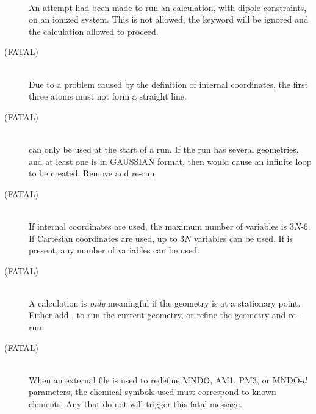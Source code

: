 \begin{description}
\item[]~\\
An attempt had been made to run an  calculation, with dipole 
constraints, on an ionized system.  This is not allowed, the keyword
 will be ignored and the calculation allowed to proceed.

\item[ (FATAL)]~\\
Due to a problem caused by the definition of internal coordinates,
the first three atoms must not form a straight line.

\item[ (FATAL)]~\\
 can only be used at the start of a run.  If the run has several
geometries, and at least one is in GAUSSIAN format, then  would
cause an infinite loop to be created.  Remove  and re-run.

\item[ (FATAL)]~\\
If internal coordinates are used, the maximum number of variables is 3$N$-6.  If 
Cartesian coordinates are used, up to 3$N$ variables can be used.  If 
is present, any number of variables can be used.

\item[ (FATAL)]~\\
A  calculation is {\em only} meaningful if the geometry is
at a stationary point.  Either add , to run the current geometry,
or refine the geometry and re-run.

\item[     (FATAL)]~\\
When an external file  is  used  to  redefine  MNDO,  AM1, PM3, or MNDO-$d$
parameters, the chemical symbols used must correspond to known elements. Any
that do not will trigger this fatal message.
                           

\end{description}
